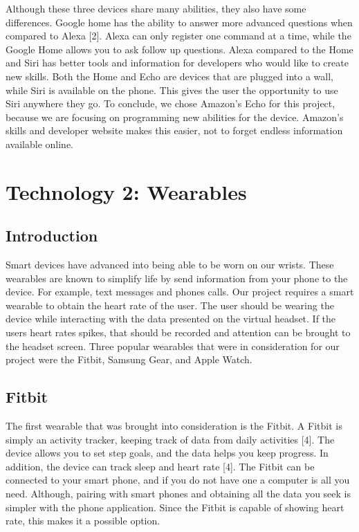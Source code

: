 \documentclass[onecolumn, draftclsnofoot,10pt, compsoc]{IEEEtran}
\begin{document}
		Although these three devices share many abilities, they also have some differences. Google home has the ability to answer more advanced questions when compared to Alexa [2]. Alexa can only register one command at a time, while the Google 
		Home allows you to ask follow up questions. Alexa compared to the Home and Siri has better tools and information for developers who would like to create new skills. Both the Home and Echo are devices that are plugged into a wall, while Siri
		is available on the phone. This gives the user the opportunity to use Siri anywhere they go. To conclude, we chose Amazon’s Echo for this project, because we are focusing on programming new abilities for the device. Amazon’s skills and developer 
		website makes this easier, not to forget endless information available online.
		
\section{Technology 2: Wearables}

	\subsection{Introduction}
	
		Smart devices have advanced into being able to be worn on our wrists. These wearables are known to simplify life by send information from your phone to the device. For example, text messages and phones calls. Our project requires a smart wearable to
		obtain the heart rate of the user. The user should be wearing the device while interacting with the data presented on the virtual headset. If the users heart rates spikes, that should be recorded and attention can be brought to the headset screen. Three 
		popular wearables that were in consideration for our project were the Fitbit, Samsung Gear, and Apple Watch.
	
	\subsection{Fitbit}
	
		The first wearable that was brought into consideration is the Fitbit. A Fitbit is simply an activity tracker, keeping track of data from daily activities [4]. The device allows you to set step goals, and the data helps you keep progress. In addition, the 
		device can track sleep and heart rate [4]. The Fitbit can be connected to your smart phone, and if you do not have one a computer is all you need. Although, pairing with smart phones and obtaining all the data you seek is simpler with the phone application. 
		Since the Fitbit is capable of showing heart rate, this makes it a possible option.
		
\end{document}
